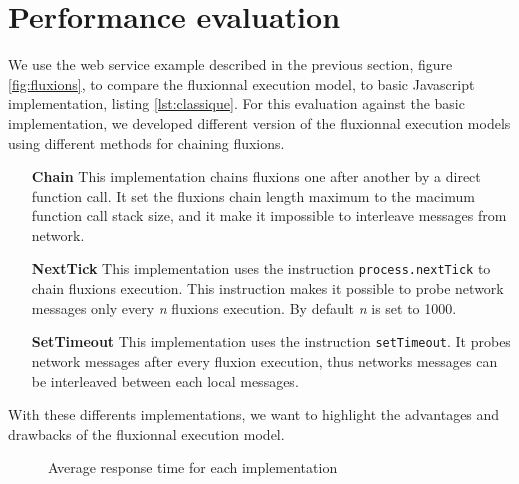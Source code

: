 \section{Performance evaluation}

We use the web service example described in the previous section, figure \ref{fig:fluxions}, to compare the fluxionnal execution model, to basic Javascript implementation, listing \ref{lst:classique}.
For this evaluation against the basic implementation, we developed different version of the fluxionnal execution models using different methods for chaining fluxions.

\begin{itemize}
	\item[\textbf{Chain}]
		This implementation chains fluxions one after another by a direct function call.
		It set the fluxions chain length maximum to the macimum function call stack size, and it make it impossible to interleave messages from network.

	\item[\textbf{NextTick}]
		This implementation uses the instruction \texttt{process.nextTick} to chain fluxions execution.
		This instruction makes it possible to probe network messages only every \textit{n} fluxions execution. By default \textit{n} is set to 1000.

	\item[\textbf{SetTimeout}]
		This implementation uses the instruction \texttt{setTimeout}.
		It probes network messages after every fluxion execution, thus networks messages can be interleaved between each local messages.
\end{itemize}

With these differents implementations, we want to highlight the advantages and drawbacks of the fluxionnal execution model.

\begin{figure}
\caption{Average response time for each implementation}
\label{fig:reponsetime}
\end{figure}



